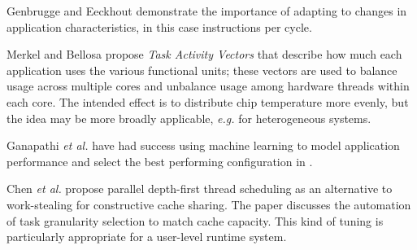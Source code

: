 Genbrugge and Eeckhout\cite{genbrugge-isca07} demonstrate the importance of adapting to changes in application characteristics, in this case instructions per cycle.

Merkel and Bellosa\cite{merkel-eurosys08} propose \emph{Task Activity Vectors} that describe how much each application uses the various functional units; these vectors are used to balance usage across multiple cores and unbalance usage among hardware threads within each core.
The intended effect is to distribute chip temperature more evenly, but the idea may be more broadly applicable, \emph{e.g.} for heterogeneous systems.

Ganapathi \emph{et al.} have had success using machine learning to model application performance and select the best performing configuration in \cite{Archana}.


%
Chen \emph{et al.}\cite{1248396} propose parallel depth-first thread scheduling as an alternative to work-stealing for constructive cache sharing.
The paper discusses the automation of task granularity selection to match cache capacity. This kind of tuning is particularly appropriate for a user-level runtime system.
